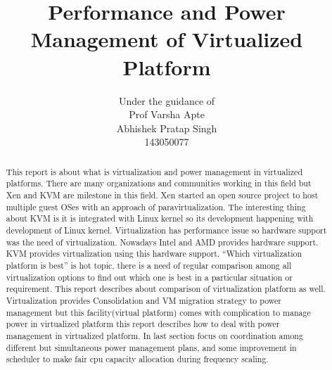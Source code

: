 \documentclass[seminar,twoside]{iitbreport}
\begin{document}
\title{Performance and Power Management of Virtualized Platform}
\author{
{Under the guidance of\\
Prof Varsha Apte}\\ \vfill Abhishek Pratap Singh \\ 143050077\\}


\maketitle

\begin{abstract}
This report is about what is virtualization and power management in virtualized platforms.
There are many organizations and communities working in this field but Xen and KVM are
milestone in this field. Xen started an open source project to host multiple guest OSes
with an approach of paravirtualization. The interesting thing about KVM is it is integrated
with Linux kernel so its development happening with development of Linux kernel. Virtualization 
has performance issue so hardware support was the need of virtualization.
Nowadays Intel and AMD provides hardware support. KVM provides virtualization using
this hardware support. “Which virtualization platform is best” is hot topic, there is a need
of regular comparison among all virtualization options to find out which one is best in a
particular situation or requirement. This report describes about comparison of virtualization 
platform as well. Virtualization provides Consolidation and VM migration strategy to
power management but this facility(virtual platform) comes with complication to manage
power in virtualized platform this report describes how to deal with power management
in virtualized platform. In last section focus on coordination among different but simultaneous 
power management plans, and some improvement in scheduler to make fair cpu
capacity allocation during frequency scaling.
\end{abstract}

\tableofcontents

\setcounter{page}{1}
\renewcommand{\thesection}{\arabic{section}}
\begingroup
\let\cleardoublepage\clearpage

\setcounter{page}{1}
\end{document}
